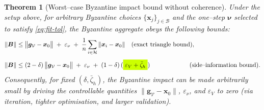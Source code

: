 \documentclass{article}
\theoremstyle{plain}
\newtheorem{theorem}{Theorem}[section]
\theoremstyle{definition}
\theoremstyle{remark}
\begin{document}
\begin{theorem}[Worst–case Byzantine impact bound without coherence]
\label{thm:wc-sideinfo}
Under the setup above, for \emph{arbitrary} Byzantine choices $\{\bm{x}_j\}_{j\in\mathcal{B}}$
and the one–step $\bm{\nu}$ selected to satisfy \eqref{eq:fit-tol}, the Byzantine aggregate
obeys the following bounds:
\begin{align}
\|\bm{B}\|
&\le
\bigl\|\bm{g}_{\mathcal{V}}-\bm{x}_0\bigr\|
\;+\;
\varepsilon_\nu
\;+\;
\frac{1}{n}
\sum_{i\in\mathcal{H}}\|\bm{x}_i-\bm{x}_0\|
\quad\text{\rm (exact triangle bound)},
\label{eq:B-bound-raw}
\\[4pt]
\|\bm{B}\|
&\le
(2-\delta)\,\bigl\|\bm{g}_{\mathcal{V}}-\bm{x}_0\bigr\|
\;+\;
\varepsilon_\nu
\;+\;
(1-\delta)\,(
  \colorbox{fluor}{%
    $\displaystyle
        \varepsilon_V+\bar{\zeta}_h	
    $%
  }
)
\qquad\qquad\qquad\ \text{\rm (side–information bound)}.
\label{eq:B-bound-side}
\end{align}
Consequently, for fixed $(\delta,\bar{\zeta}_h)$, the Byzantine impact can be made
arbitrarily small by driving the controllable quantities
$\|\bm{g}_{\mathcal{V}}-\bm{x}_0\|$, $\varepsilon_\nu$, and $\varepsilon_V$
to zero (via iteration, tighter optimisation, and larger validation).
\end{theorem}
\end{document}
